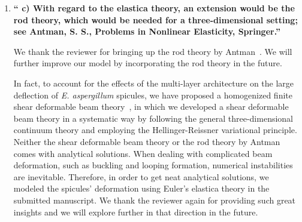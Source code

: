 \documentclass[11pt,letterpaper]{report}
\begin{document}
\begin{enumerate}[label=\textit{1.\arabic*},wide, labelwidth=!, labelindent=0pt]





\newpage
\item \label{r1c4} {\bf ``
c) With regard to the elastica theory, an extension would be the rod theory, which would be needed for a three-dimensional setting; see Antman, S. S., Problems in Nonlinear Elasticity, Springer.''}



We thank the reviewer for bringing up the rod theory by Antman~\cite{antman2005problems}. We will further improve our model by incorporating the rod theory in the future.

In fact, to account for the effects of the multi-layer architecture on the large deflection of \textit{E. aspergillum} spicules, we have proposed a homogenized finite shear deformable beam theory~\cite{FangShearBeam}, in which we developed a shear deformable beam theory in a systematic way by following the general three-dimensional continuum theory and employing the Hellinger-Reissner variational principle. Neither the shear deformable beam theory or the rod theory by Antman comes with analytical solutions. When dealing with complicated beam deformation, such as buckling and looping formation, numerical instabilities are inevitable. Therefore, in order to get neat analytical solutions, we modeled the spicules' deformation using Euler's elastica theory in the submitted manuscript. We thank the reviewer again for providing such great insights and we will explore further in that direction in the future.




\end{enumerate}
\end{document}
